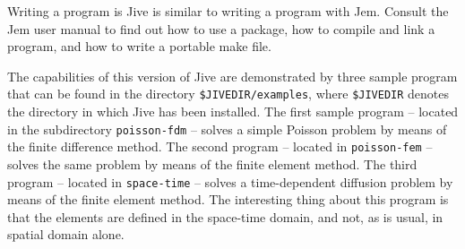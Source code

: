 \documentclass[a4paper,12pt,english]{habanera-shortmanual}
\newcommand{\Code}[1]{\texttt{#1}}
\begin{document}
\BlankLine
Writing a program is Jive is similar to writing a program with
Jem. Consult the Jem user manual to find out how to use a package, how
to compile and link a program, and how to write a portable make file.

\BlankLine
The capabilities of this version of Jive are demonstrated by three
sample program that can be found in the directory
\Code{\$JIVEDIR/examples}, where \Code{\$JIVEDIR} denotes the
directory in which Jive has been installed. The first sample program
-- located in the subdirectory \Code{poisson-fdm} -- solves a simple
Poisson problem by means of the finite difference method. The second
program -- located in \Code{poisson-fem} -- solves the same problem by
means of the finite element method. The third program -- located in
\Code{space-time} -- solves a time-dependent diffusion problem by
means of the finite element method. The interesting thing about this
program is that the elements are defined in the space-time domain, and
not, as is usual, in spatial domain alone.
\end{document}
